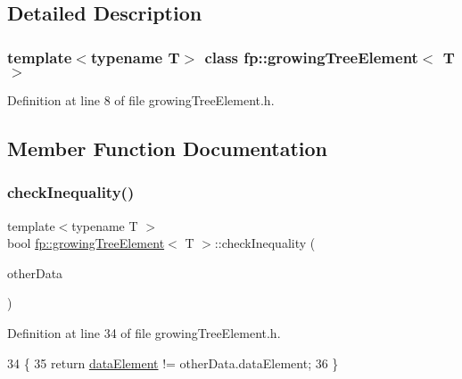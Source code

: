 \subsection{Detailed Description}
\subsubsection*{template$<$typename T$>$\newline
class fp\+::growing\+Tree\+Element$<$ T $>$}



Definition at line 8 of file growing\+Tree\+Element.\+h.



\subsection{Member Function Documentation}
\mbox{\label{classfp_1_1growingTreeElement_a4d94211c8127a82719ac33dd40edf6aa}} 
\subsubsection{\texorpdfstring{check\+Inequality()}{checkInequality()}}
{\footnotesize\ttfamily template$<$typename T $>$ \\
bool \hyperlink{classfp_1_1growingTreeElement}{fp\+::growing\+Tree\+Element}$<$ T $>$\+::check\+Inequality (\begin{DoxyParamCaption}\item[{const \hyperlink{classfp_1_1labeledData}{labeled\+Data}$<$ T $>$ \&}]{other\+Data }\end{DoxyParamCaption})\hspace{0.3cm}{\ttfamily [inline]}}



Definition at line 34 of file growing\+Tree\+Element.\+h.


\begin{DoxyCode}
34                                                                             \{
35                     \textcolor{keywordflow}{return} \hyperlink{classfp_1_1growingTreeElement_ae56213ef46269673e10a4046d7cfc7e4}{dataElement} != otherData.dataElement;
36                 \}
\end{DoxyCode}
\mbox{\label{classfp_1_1growingTreeElement_a60d0647dff7d4a92d3851209dc15c75f}} 

